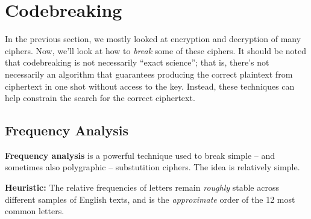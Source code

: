 \documentclass[letterpaper]{article}
\begin{document}
\newpage 
\section{Codebreaking}
In the previous section, we mostly looked at encryption and decryption of many ciphers. Now, we'll look at how to \emph{break} some of these ciphers. It should be noted that codebreaking is not necessarily ``exact science''; that is, there's not necessarily an algorithm that guarantees producing the correct plaintext from ciphertext in one shot without access to the key. Instead, these techniques can help constrain the search for the correct ciphertext. 

\subsection{Frequency Analysis}
\textbf{Frequency analysis} is a powerful technique used to break simple -- and sometimes also polygraphic -- substutition ciphers. The idea is relatively simple. 

\begin{displayquote}
    \textbf{Heuristic:} The relative frequencies of letters remain \emph{roughly} stable across different samples of English texts, and  is the \emph{approximate} order of the 12 most common letters.
\end{displayquote}
\end{document}
